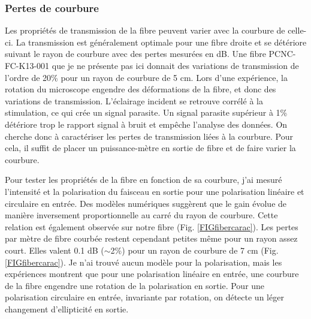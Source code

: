 \subsubsection{Pertes de courbure}


Les propriétés de transmission de la fibre peuvent varier avec la courbure de celle-ci. La transmission est généralement optimale pour une fibre droite et se détériore suivant le rayon de courbure avec des pertes mesurées en dB. Une fibre PCNC-FC-K13-001 que je ne présente pas ici donnait des variations de transmission de l'ordre de 20\% pour un rayon de courbure de 5 cm.
Lors d'une expérience, la rotation du microscope engendre des déformations de la fibre, et donc des variations de transmission. L'éclairage incident se retrouve corrélé à la stimulation, ce qui crée un signal parasite. Un signal parasite supérieur à 1\% détériore trop le rapport signal à bruit et empêche l'analyse des données. On cherche donc à caractériser les pertes de transmission liées à la courbure. Pour cela, il suffit de placer un puissance-mètre en sortie de fibre et de faire varier la courbure.

Pour tester les propriétés de la fibre en fonction de sa courbure, j'ai mesuré l'intensité et la polarisation du faisceau en sortie pour une polarisation linéaire et circulaire en entrée. Des modèles numériques \cite{yu_negative_2016} \cite{setti_flexible_2013} \cite{frosz_analytical_2017} suggèrent que le gain évolue de manière inversement proportionnelle au carré du rayon de courbure. Cette relation est également observée sur notre fibre (Fig. \ref{FIGfibercarac}). Les pertes par mètre de fibre courbée restent cependant petites même pour un rayon assez court. Elles valent 0.1 dB ($\sim$2\%) pour un rayon de courbure de 7 cm (Fig. \ref{FIGfibercarac}). Je n'ai trouvé aucun modèle pour la polarisation, mais les expériences montrent que pour une polarisation linéaire en entrée, une courbure de la fibre engendre une rotation de la polarisation en sortie. Pour une polarisation circulaire en entrée, invariante par rotation, on détecte un léger changement d'ellipticité en sortie.

